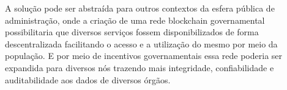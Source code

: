 A solução pode ser abstraída para outros contextos da esfera pública de administração, onde a criação de uma rede blockchain governamental possibilitaria que diversos serviços fossem disponibilizados de forma descentralizada facilitando o acesso e a utilização do mesmo por meio da população. E por meio de incentivos governamentais essa rede poderia ser expandida para diversos nós trazendo mais integridade, confiabilidade e auditabilidade aos dados de diversos órgãos.